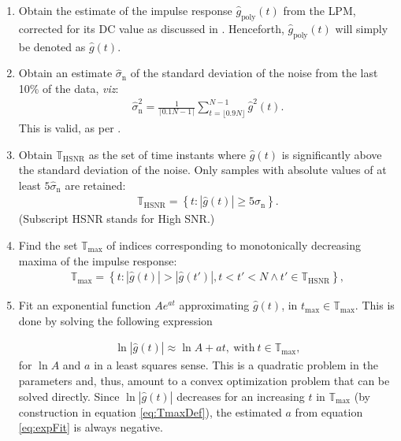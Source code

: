 \begin{enumerate}
\item Obtain the estimate of the impulse response $\hat g_\mathrm{poly}(t)$ from the \gls{LPM}, corrected for its \gls{DC} value as discussed in . 
Henceforth, $\hat g_\mathrm{poly}(t)$ will simply be denoted as $\hat g(t)$.

\item Obtain an estimate $\hat \sigma_\mathrm{n}$ of the standard deviation of the noise from the last 10\% of the data, \emph{viz}:
\begin{align}
\hat \sigma^2_\mathrm{n}=\frac{1}{\lceil0.1N - 1\rceil}\sum_{t=\lfloor0.9N\rfloor}^{N-1}\hat g^2(t).
\end{align}
This is valid, as per .


\item Obtain $\mathbb{T}_\mathrm{HSNR}$ as the set of time instants where $\hat g(t)$ is significantly above the standard deviation of the noise. Only samples with absolute values of at least $5\hat\sigma_\mathrm{n}$ are retained: %
\begin{align}
\mathbb{T}_\mathrm{HSNR} = \left\{
t:|\hat g(t)|\geqslant 5\hat\sigma_\mathrm{n}
\right\}.
\end{align}
(Subscript HSNR stands for High \gls{SNR}.)


\item Find the set $\mathbb{T}_\mathrm{max}$ of indices corresponding to monotonically decreasing maxima of the impulse response:
\begin{align}\label{eq:TmaxDef}
\mathbb{T}_\mathrm{max} = \left\{
t: \left| \hat g(t)\right|>
\left|\hat g(t')\right|,
t < t' < N \land t'\in\mathbb{T}_\mathrm{HSNR}
\right\},
\end{align}

\item Fit an exponential function $Ae^{at}$ approximating $\hat g(t)$, in $t_\mathrm{max}\in\mathbb{T}_\mathrm{max}$. 
This is done by solving the following expression

\begin{align}\label{eq:expFit}
\ln \left|\hat g(t)\right|\approx \ln A+at,\ \mathrm{with}\ t\in\mathbb{T}_\mathrm{max},
\end{align}
for $\ln A$ and $a$ in a least squares sense.
This is a quadratic problem in the parameters and, thus, amount to a convex optimization problem that can be solved directly.
Since  $\ln \left|\hat g(t)\right|$ decreases for an increasing $t$ in $\mathbb{T}_\mathrm{max}$ (by construction in equation \eqref{eq:TmaxDef}), the estimated $a$ from equation \eqref{eq:expFit} is always negative.


\end{enumerate}

